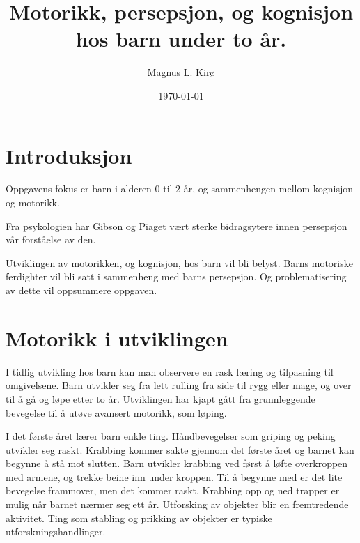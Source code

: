 \documentclass[12pt, a4paper]{article}
\title{
	Motorikk, persepsjon, og kognisjon \\ hos barn under to år. 
}
\author{
	Magnus L. Kirø \\
}
\date{\today}
\begin{document}
\maketitle
{}

%
%
%
%

\tableofcontents
\newpage

\section{Introduksjon} %

Oppgavens fokus er barn i alderen 0 til 2 år, og sammenhengen mellom kognisjon
og motorikk.  

Fra psykologien har Gibson og Piaget vært sterke bidragsytere innen persepsjon
vår forståelse av den. 

Utviklingen av motorikken, og kognisjon, hos barn vil bli belyst. 
Barns motoriske ferdighter vil bli satt i sammenheng med barns persepsjon. 
Og problematisering av dette vil oppsummere oppgaven.  

\section{Motorikk i utviklingen} %

I tidlig utvikling hos barn kan man observere en rask læring og tilpasning til
omgivelsene. Barn utvikler seg fra lett rulling fra side til rygg eller mage,
og over til å gå og løpe etter to år. Utviklingen har kjapt gått fra
grunnleggende bevegelse til å utøve avansert motorikk, som løping. 

I det første året lærer barn enkle ting. Håndbevegelser som griping og peking
utvikler seg raskt. Krabbing kommer sakte gjennom det første året og barnet kan
begynne å stå mot slutten. Barn utvikler krabbing ved først å løfte overkroppen
med armene, og trekke beine inn under kroppen. Til å begynne med er det lite
bevegelse frammover, men det kommer raskt. Krabbing opp og ned trapper er mulig
når barnet nærmer seg ett år.  
Utforsking av objekter blir en fremtredende
aktivitet. Ting som stabling og prikking av objekter er typiske
utforskningshandlinger. 
\end{document}
